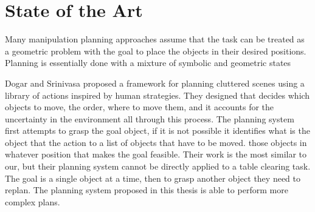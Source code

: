 \chapter{State of the Art}
\label{ch:state_of_the_art}

Many manipulation planning approaches  assume that the task can be treated as a geometric problem\DMC{,}{} with the goal to place the objects in their desired positions. Planning is essentially done with a mixture  of symbolic and geometric states



Dogar and Srinivasa \cite{Dogar2011} proposed a framework for planning  cluttered scenes using a library of actions inspired by human strategies. They designed  that decides which
objects to move, the order, where to move them, and   it accounts for the uncertainty
in the environment all through this process. 
The planning system first attempts to grasp the goal object,  if it is not possible\DM{,} it identifies what is the object that  the action to a list of  objects that have to be moved.  those objects  in whatever position  that makes the goal feasible. 
Their work is the most similar to our, but their planning system cannot be directly applied to a table clearing task. The goal is a single object at a time, then to grasp another object they need to replan. The planning system proposed in this thesis is able to perform more complex plans. 

